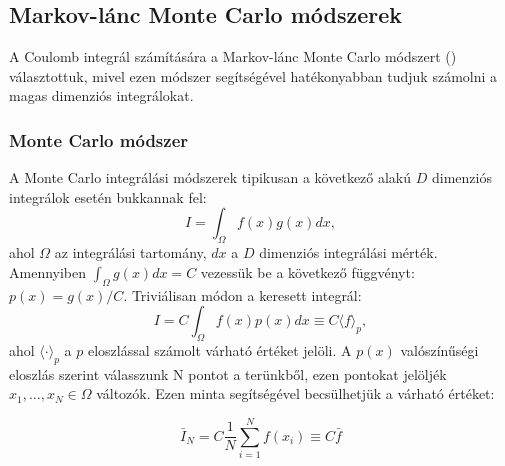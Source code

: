 \documentclass[10pt,a4paper]{article}
\numberwithin{equation}{subsection}
\numberwithin{figure}{section}
\begin{document}
\subsection{Markov-lánc Monte Carlo módszerek}

A Coulomb integrál számítására a Markov-lánc Monte Carlo módszert (\cite{mcbook}) választottuk, mivel ezen módszer segítségével hatékonyabban tudjuk számolni a magas dimenziós integrálokat.

\subsubsection{Monte Carlo módszer}

A Monte Carlo integrálási módszerek tipikusan a következő alakú  $D$ dimenziós integrálok esetén bukkannak fel:
\begin{equation}
I=\int_\Omega f(x)g(x) dx,
\end{equation}
ahol $\Omega$ az integrálási tartomány, $dx$ a $D$ dimenziós integrálási mérték. Amennyiben $\int_\Omega g(x)dx = C$ vezessük be a következő függvényt: $p(x)=g(x)/C$. Triviálisan módon a keresett integrál: 
\begin{equation}
I=C\int_\Omega f(x)p(x)dx \equiv C\langle f \rangle_p,
\end{equation}
ahol  $\langle \cdot \rangle_p$ a $p$ eloszlással számolt várható értéket jelöli.
A $p(x)$ valószínűségi eloszlás szerint válasszunk N pontot a terünkből, ezen pontokat jelöljék $x_1,\dots,x_N\in\Omega$ változók. Ezen minta segítségével becsülhetjük a várható értéket:

\begin{equation}
\bar{I}_N = C\frac{1}{N}\sum_{i=1}^N f(x_i)\equiv C\bar{f}
\label{eq:IN}
\end{equation} 
\end{document}
